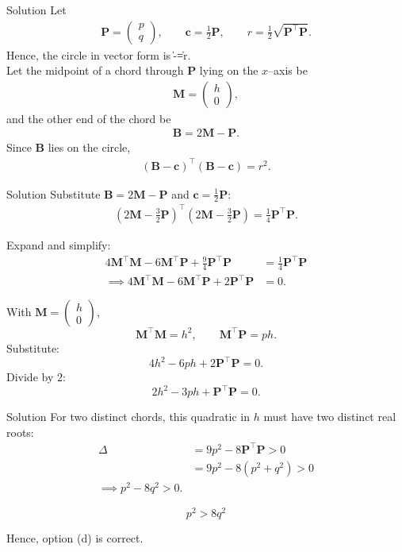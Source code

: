 \documentclass{beamer}
\newcommand{\myvec}[1]{\begin{pmatrix}#1\end{pmatrix}}
\newcommand{\brak}[1]{\left( #1 \right)}
\renewcommand{\vec}[1]{\mathbf{#1}}
\begin{document}
\begin{frame}{Solution}
Let
\begin{align}
\vec{P}=\myvec{p\\[2pt] q},\qquad 
\vec{c}=\frac{1}{2}\vec{P},\qquad 
r=\frac{1}{2}\sqrt{\vec{P}^\top\vec{P}}.
\end{align}
Hence, the circle in vector form is
\|\vec{x}-\vec{c}\|=r.\\
Let the midpoint of a chord through $\vec{P}$ lying on the $x$–axis be
\begin{align}
\vec{M}=\myvec{h\\[2pt]0},
\end{align}
and the other end of the chord be
\begin{align}
\vec{B}=2\vec{M}-\vec{P}.
\end{align}
Since $\vec{B}$ lies on the circle,
\begin{align}
\brak{\vec{B}-\vec{c}}^\top\brak{\vec{B}-\vec{c}}=r^2.
\end{align}
\end{frame}
\begin{frame}{Solution}
Substitute $\vec{B}=2\vec{M}-\vec{P}$ and $\vec{c}=\frac{1}{2}\vec{P}$:
\begin{align}
\brak{2\vec{M}-\frac{3}{2}\vec{P}}^\top\brak{2\vec{M}-\frac{3}{2}\vec{P}}
= \frac{1}{4}\vec{P}^\top\vec{P}.
\end{align}

Expand and simplify:
\begin{align}
4\vec{M}^\top\vec{M}-6\vec{M}^\top\vec{P}+\frac{9}{4}\vec{P}^\top\vec{P}
&= \frac{1}{4}\vec{P}^\top\vec{P} \\[2pt]
\implies 4\vec{M}^\top\vec{M}-6\vec{M}^\top\vec{P}+2\vec{P}^\top\vec{P} &= 0.
\end{align}

With $\vec{M}=\myvec{h\\[2pt]0}$,
\[
\vec{M}^\top\vec{M}=h^2,\qquad 
\vec{M}^\top\vec{P}=ph.
\]
Substitute:
\[
4h^2-6ph+2\vec{P}^\top\vec{P}=0.
\]
Divide by $2$:
\[
2h^2-3ph+\vec{P}^\top\vec{P}=0.
\]
\end{frame}
\begin{frame}{Solution}
For two distinct chords, this quadratic in $h$ must have two distinct real roots:
\begin{align}
\Delta &= 9p^2 - 8\vec{P}^\top\vec{P} > 0 \\[2pt]
&= 9p^2 - 8(p^2+q^2) > 0 \\[2pt]
\implies p^2 - 8q^2 > 0.
\end{align}

\[
\boxed{p^2 > 8q^2}
\]

Hence, option (d) is correct.
\end{frame}
\end{document}
